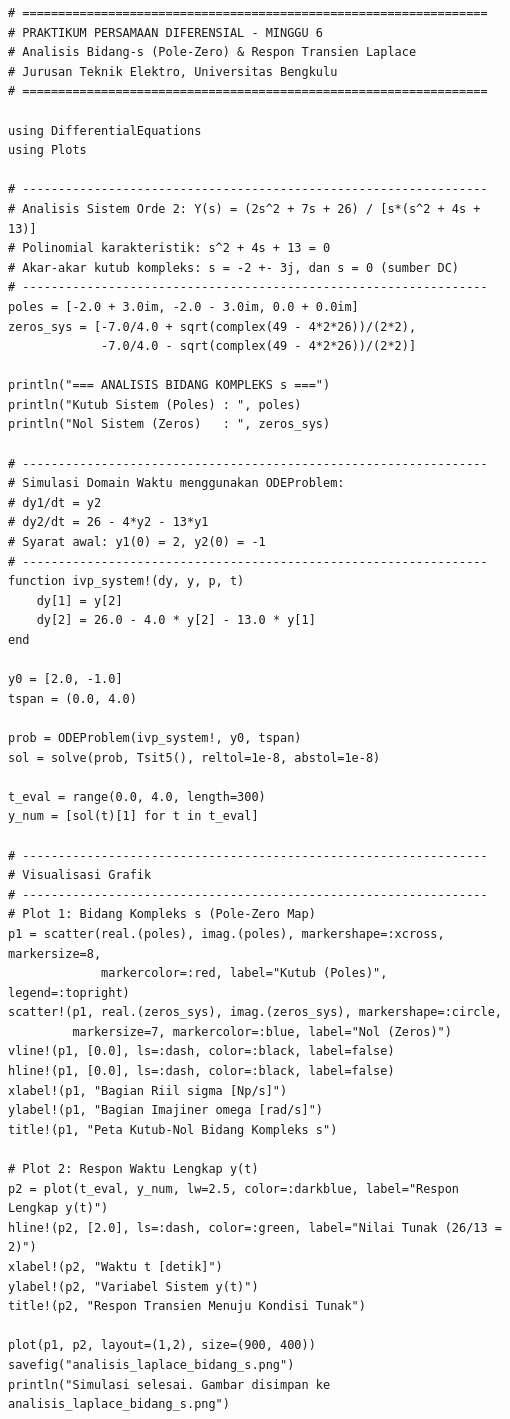 \documentclass[11pt,a4paper]{article}
\theoremstyle{definition}
\begin{document}
\begin{lstlisting}[style=juliastyle, caption={Analisis Bidang Kompleks s dan Respon Waktu Menggunakan Julia.}, label={lst:julia_laplace}]
# =================================================================
# PRAKTIKUM PERSAMAAN DIFERENSIAL - MINGGU 6
# Analisis Bidang-s (Pole-Zero) & Respon Transien Laplace
# Jurusan Teknik Elektro, Universitas Bengkulu
# =================================================================

using DifferentialEquations
using Plots

# -----------------------------------------------------------------
# Analisis Sistem Orde 2: Y(s) = (2s^2 + 7s + 26) / [s*(s^2 + 4s + 13)]
# Polinomial karakteristik: s^2 + 4s + 13 = 0
# Akar-akar kutub kompleks: s = -2 +- 3j, dan s = 0 (sumber DC)
# -----------------------------------------------------------------
poles = [-2.0 + 3.0im, -2.0 - 3.0im, 0.0 + 0.0im]
zeros_sys = [-7.0/4.0 + sqrt(complex(49 - 4*2*26))/(2*2), 
             -7.0/4.0 - sqrt(complex(49 - 4*2*26))/(2*2)]

println("=== ANALISIS BIDANG KOMPLEKS s ===")
println("Kutub Sistem (Poles) : ", poles)
println("Nol Sistem (Zeros)   : ", zeros_sys)

# -----------------------------------------------------------------
# Simulasi Domain Waktu menggunakan ODEProblem:
# dy1/dt = y2
# dy2/dt = 26 - 4*y2 - 13*y1
# Syarat awal: y1(0) = 2, y2(0) = -1
# -----------------------------------------------------------------
function ivp_system!(dy, y, p, t)
    dy[1] = y[2]
    dy[2] = 26.0 - 4.0 * y[2] - 13.0 * y[1]
end

y0 = [2.0, -1.0]
tspan = (0.0, 4.0)

prob = ODEProblem(ivp_system!, y0, tspan)
sol = solve(prob, Tsit5(), reltol=1e-8, abstol=1e-8)

t_eval = range(0.0, 4.0, length=300)
y_num = [sol(t)[1] for t in t_eval]

# -----------------------------------------------------------------
# Visualisasi Grafik
# -----------------------------------------------------------------
# Plot 1: Bidang Kompleks s (Pole-Zero Map)
p1 = scatter(real.(poles), imag.(poles), markershape=:xcross, markersize=8,
             markercolor=:red, label="Kutub (Poles)", legend=:topright)
scatter!(p1, real.(zeros_sys), imag.(zeros_sys), markershape=:circle,
         markersize=7, markercolor=:blue, label="Nol (Zeros)")
vline!(p1, [0.0], ls=:dash, color=:black, label=false)
hline!(p1, [0.0], ls=:dash, color=:black, label=false)
xlabel!(p1, "Bagian Riil sigma [Np/s]")
ylabel!(p1, "Bagian Imajiner omega [rad/s]")
title!(p1, "Peta Kutub-Nol Bidang Kompleks s")

# Plot 2: Respon Waktu Lengkap y(t)
p2 = plot(t_eval, y_num, lw=2.5, color=:darkblue, label="Respon Lengkap y(t)")
hline!(p2, [2.0], ls=:dash, color=:green, label="Nilai Tunak (26/13 = 2)")
xlabel!(p2, "Waktu t [detik]")
ylabel!(p2, "Variabel Sistem y(t)")
title!(p2, "Respon Transien Menuju Kondisi Tunak")

plot(p1, p2, layout=(1,2), size=(900, 400))
savefig("analisis_laplace_bidang_s.png")
println("Simulasi selesai. Gambar disimpan ke analisis_laplace_bidang_s.png")
\end{lstlisting}
\end{document}
